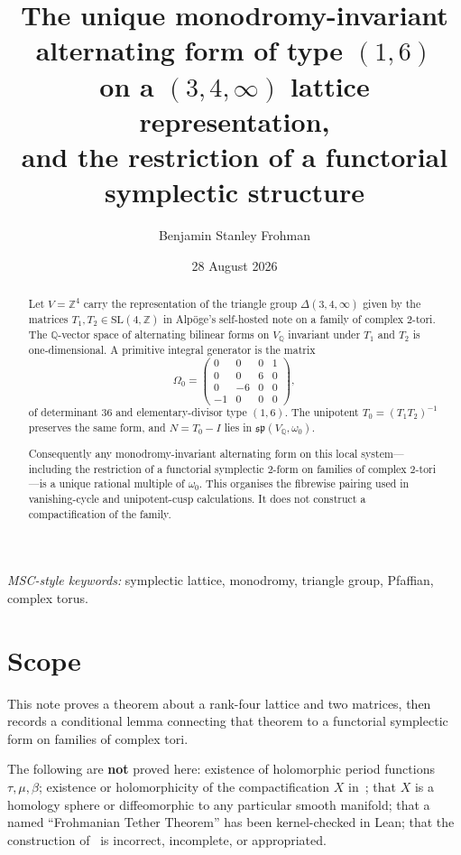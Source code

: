 \documentclass[11pt,a4paper]{article}
\title{The unique monodromy-invariant alternating form of type $(1,6)$\\
on a $(3,4,\infty)$ lattice representation,\\
and the restriction of a functorial symplectic structure}
\author{Benjamin Stanley Frohman}
\date{28 August 2026}
\theoremstyle{definition}
\theoremstyle{remark}
\newcommand{\Q}{\mathbb{Q}}
\newcommand{\Z}{\mathbb{Z}}
\newcommand{\spq}{\mathfrak{sp}}
\begin{document}
\maketitle

\begin{abstract}
Let $V=\Z^4$ carry the representation of the triangle group $\Delta(3,4,\infty)$ given by the matrices $T_1,T_2\in\mathrm{SL}(4,\Z)$ in Alp\"oge's self-hosted note on a family of complex $2$-tori. The $\Q$-vector space of alternating bilinear forms on $V_{\Q}$ invariant under $T_1$ and $T_2$ is one-dimensional. A primitive integral generator is the matrix
\[
\Omega_0=\begin{pmatrix}0&0&0&1\\0&0&6&0\\0&-6&0&0\\-1&0&0&0\end{pmatrix},
\]
of determinant $36$ and elementary-divisor type $(1,6)$. The unipotent $T_0=(T_1T_2)^{-1}$ preserves the same form, and $N=T_0-I$ lies in $\spq(V_{\Q},\omega_0)$.

Consequently any monodromy-invariant alternating form on this local system---including the restriction of a functorial symplectic $2$-form on families of complex $2$-tori---is a unique rational multiple of $\omega_0$. This organises the fibrewise pairing used in vanishing-cycle and unipotent-cusp calculations. It does not construct a compactification of the family.
\end{abstract}

\noindent\textit{MSC-style keywords:} symplectic lattice, monodromy, triangle group, Pfaffian, complex torus.

\tableofcontents

\section{Scope}

This note proves a theorem about a rank-four lattice and two matrices, then records a conditional lemma connecting that theorem to a functorial symplectic form on families of complex tori.

The following are \textbf{not} proved here: existence of holomorphic period functions $\tau,\mu,\beta$; existence or holomorphicity of the compactification $X$ in~\cite{AlpogeS6}; that $X$ is a homology sphere or diffeomorphic to any particular smooth manifold; that a named ``Frohmanian Tether Theorem'' has been kernel-checked in Lean; that the construction of~\cite{AlpogeS6} is incorrect, incomplete, or appropriated.
\end{document}
